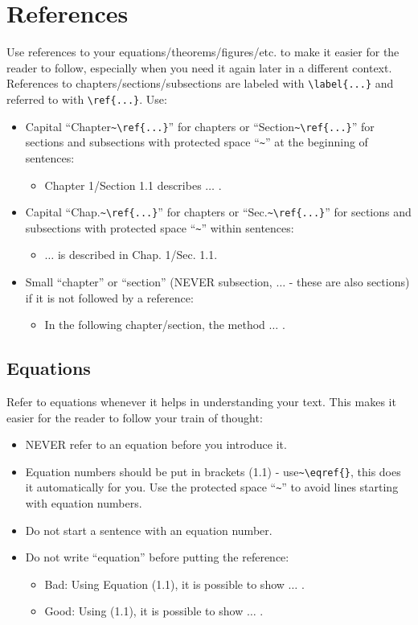 \section{References}

Use references to your equations/theorems/figures/etc. to make it easier for the reader to follow, especially when you need it again later in a different context.
References to chapters/sections/subsections are labeled with \verb|\label{...}| and referred to with \verb|\ref{...}|. Use: 

\begin{itemize}
	\item Capital ``Chapter\verb|~\ref{...}|'' for chapters or ``Section\verb|~\ref{...}|'' for sections and subsections with protected space ``\verb|~|'' at the beginning of sentences:
	\begin{itemize}
		\item Chapter 1/Section 1.1 describes $\ldots$ .
	\end{itemize}
	\item Capital ``Chap.\verb|~\ref{...}|'' for chapters or ``Sec.\verb|~\ref{...}|'' for sections and subsections with protected space ``\verb|~|'' within sentences:
	\begin{itemize}
		\item $\ldots$ is described in Chap. 1/Sec. 1.1.
	\end{itemize}
	\item Small ``chapter'' or ``section'' (NEVER subsection, $\ldots$ - these are also sections) if it is not followed by a reference:
	\begin{itemize}
		\item In the following chapter/section, the method $\ldots$ .
	\end{itemize}
\end{itemize}

\subsection{Equations}
Refer to equations whenever it helps in understanding your text. This makes it easier for the reader to follow your train of thought:
\begin{itemize}
	\item NEVER refer to an equation before you introduce it. 
	\item Equation numbers should be put in brackets (1.1) - use\verb|~\eqref{}|, this does it automatically for you. Use the protected space ``\verb|~|'' to avoid lines starting with equation numbers.
	\item Do not start a sentence with an equation number.
	\item Do not write ``equation'' before putting the reference:
	\begin{itemize}
		\item Bad: Using Equation (1.1), it is possible to show $\ldots$ .
		\item Good: Using (1.1), it is possible to show $\ldots$ .
	\end{itemize}
\end{itemize}

